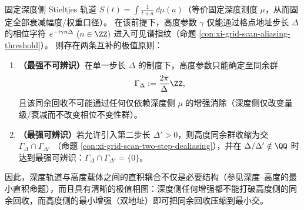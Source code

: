 \begin{proposition}\label{prop:xi-depth-height-two-level-extremal}
固定深度侧 Stieltjes 轨道 \(S(t)=\int\frac{1}{t+a}\,\dd\mu(a)\)（等价固定深度测度 \(\mu\)，从而固定全部衰减幅度/权重口径）。
在该前提下，高度参数 \(\gamma\) 仅能通过格点地址步长 \(\Delta\) 的相位字符 \(e^{-\mathrm{i}\gamma n\Delta}\ (n\in\ZZ)\) 进入可见谱指纹（命题 \ref{con:xi-grid-scan-aliasing-threshold}）。
则存在两条互补的极值原则：
\begin{enumerate}
  \item \textbf{（最强不可辨识）}在单一步长 \(\Delta\) 的制度下，高度参数只能确定至同余群
  \[
  \Gamma_{\Delta}:=\frac{2\pi}{\Delta}\ZZ,
  \]
  且该同余回收不可能通过任何仅依赖深度侧 \(\mu\) 的增强消除（深度侧仅改变量级/衰减而不改变相位不变性群）。
  \item \textbf{（最强可辨识）}若允许引入第二步长 \(\Delta'>0\)，则高度同余群收缩为交
  \(
  \Gamma_{\Delta}\cap\Gamma_{\Delta'}
  \)
  （命题 \ref{con:xi-grid-scan-two-step-dealiasing}），并在 \(\Delta/\Delta'\notin\QQ\) 时达到最强可辨识：\(\Gamma_{\Delta}\cap\Gamma_{\Delta'}=\{0\}\)。
\end{enumerate}
因此，深度轨道与高度载体之间的直积耦合不仅是必要结构（参见深度--高度的最小直积命题），而且具有清晰的极值相图：深度侧任何增强都不能打破高度侧的同余回收，而高度侧的最小增强（双地址）即可把同余回收压缩到最小交。
\end{proposition}

\endinput
